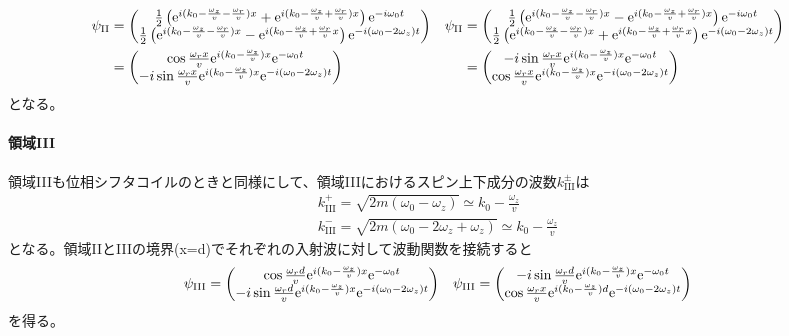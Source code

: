 \begin{align}
\psi_\mathrm{II} &=\begin{pmatrix} \frac{1}{2} \left(\mathrm{e}^{i(k_0-\frac{\omega_z}{v}-\frac{\omega_r}{v})x}+\mathrm{e}^{i(k_0-\frac{\omega_z}{v}+\frac{\omega_r}{v})x}\right) \mathrm{e}^{-i\omega_0t} \\ \frac{1}{2} \left(\mathrm{e}^{i(k_0-\frac{\omega_z}{v}-\frac{\omega_r}{v})x}-\mathrm{e}^{i(k_0-\frac{\omega_z}{v}+\frac{\omega_r}{v}x}\right) \mathrm{e}^{-i(\omega_0-2\omega_z)t}\end{pmatrix} &\psi_\mathrm{II}&=\begin{pmatrix} \frac{1}{2} \left(\mathrm{e}^{i(k_0-\frac{\omega_z}{v}-\frac{\omega_r}{v})x}-\mathrm{e}^{i(k_0-\frac{\omega_z}{v}+\frac{\omega_r}{v})x}\right) \mathrm{e}^{-i\omega_0t} \\ \frac{1}{2} \left(\mathrm{e}^{i(k_0-\frac{\omega_z}{v}-\frac{\omega_r}{v})x}+\mathrm{e}^{i(k_0-\frac{\omega_z}{v}+\frac{\omega_r}{v}x}\right) \mathrm{e}^{-i(\omega_0-2\omega_z)t}\end{pmatrix} \notag \\
&=\begin{pmatrix} \cos \frac{\omega_r x}{v} \mathrm{e}^{i(k_0-\frac{\omega_z}{v})x}\mathrm{e}^{-\omega_0t} \\ -i\sin\frac{\omega_r x}{v} \mathrm{e}^{i(k_0-\frac{\omega_z}{v})x}\mathrm{e}^{-i(\omega_0-2\omega_z)t} \end{pmatrix} &&=\begin{pmatrix} -i\sin\frac{\omega_rx}{v} \mathrm{e}^{i(k_0-\frac{\omega_z}{v})x}\mathrm{e}^{-\omega_0t} \\ \cos \frac{\omega_r x}{v} \mathrm{e}^{i(k_0-\frac{\omega_z}{v})x}\mathrm{e}^{-i(\omega_0-2\omega_z)t} \end{pmatrix}
\end{align}
となる。

\paragraph{領域III}
領域IIIも位相シフタコイルのときと同様にして、領域IIIにおけるスピン上下成分の波数$k^\pm_\mathrm{III}$は
\begin{align}
k^+_\mathrm{III}=\sqrt{2m(\omega_0-\omega_z)}\simeq k_0 -\frac{\omega_z}{v}\\
k^-_\mathrm{III}=\sqrt{2m(\omega_0-2\omega_z+\omega_z)}\simeq k_0 -\frac{\omega_z}{v}
\end{align}
となる。領域IIとIIIの境界(x=d)でそれぞれの入射波に対して波動関数を接続すると
\begin{align}
\psi_\mathrm{III}=\begin{pmatrix} \cos \frac{\omega_r d}{v} \mathrm{e}^{i(k_0-\frac{\omega_z}{v})x}\mathrm{e}^{-\omega_0t} \\ -i\sin\frac{\omega_r d}{v} \mathrm{e}^{i(k_0-\frac{\omega_z}{v})x}\mathrm{e}^{-i(\omega_0-2\omega_z)t} \end{pmatrix} &&\psi_\mathrm{III}=\begin{pmatrix} -i\sin\frac{\omega_rd}{v} \mathrm{e}^{i(k_0-\frac{\omega_z}{v})x}\mathrm{e}^{-\omega_0t} \\ \cos \frac{\omega_r x}{v} \mathrm{e}^{i(k_0-\frac{\omega_z}{v})d}\mathrm{e}^{-i(\omega_0-2\omega_z)t} \end{pmatrix}
\end{align}
を得る。


